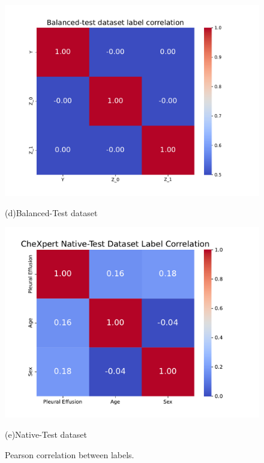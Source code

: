 \documentclass[12pt,DIV14,BCOR12mm,a4paper,footinclude=false,headinclude,parskip=half-,twoside,openright,cleardoublepage=empty,toc=index,bibliography=totoc,listof=totoc]{scrreprt}
\numberwithin{equation}{chapter}
\begin{document}
\begin{figure}[H]
    \begin{minipage}[b]{0.3\textwidth}
        \centering
        \includegraphics[width=1.5\textwidth]{thesis/figures/balTest_corr.pdf}
        \caption*{(d)Balanced-Test dataset}
        \label{fig:4}
    \end{minipage}
    \hspace{1cm}
    \begin{minipage}[b]{0.3\textwidth}
        \centering
        \includegraphics[width=1.5\textwidth]{thesis/figures/native-testcorr.pdf}
        \caption*{(e)Native-Test dataset}
        \label{fig:5}
    \end{minipage}
    \caption{Pearson correlation between labels.}
    \label{fig:correlations}
\end{figure}
\end{document}
